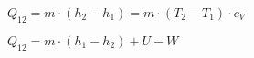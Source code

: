 \( Q_{12} = m \cdot (h_2 - h_1) = m \cdot (T_2 - T_1) \cdot c_V \)  

\( Q_{12} = m \cdot (h_1 - h_2) + U - W \)